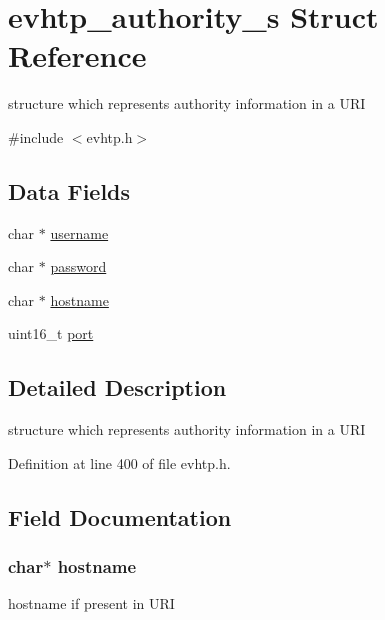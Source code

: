 \hypertarget{structevhtp__authority__s}{\section{evhtp\-\_\-authority\-\_\-s Struct Reference}
\label{structevhtp__authority__s}
}


structure which represents authority information in a U\-R\-I  




{\ttfamily \#include $<$evhtp.\-h$>$}

\subsection*{Data Fields}
\begin{DoxyCompactItemize}
\item 
char $\ast$ \hyperlink{structevhtp__authority__s_a9b20c006bd90a09e1465fb668700e81d}{username}
\item 
char $\ast$ \hyperlink{structevhtp__authority__s_a59460a3ff2c12443d1022e5cc0fba85c}{password}
\item 
char $\ast$ \hyperlink{structevhtp__authority__s_af203df082d5c6dcaa0c88b07cf86466d}{hostname}
\item 
uint16\-\_\-t \hyperlink{structevhtp__authority__s_a8e0798404bf2cf5dabb84c5ba9a4f236}{port}
\end{DoxyCompactItemize}


\subsection{Detailed Description}
structure which represents authority information in a U\-R\-I 

Definition at line 400 of file evhtp.\-h.



\subsection{Field Documentation}
\hypertarget{structevhtp__authority__s_af203df082d5c6dcaa0c88b07cf86466d}{
\subsubsection[{hostname}]{\setlength{\rightskip}{0pt plus 5cm}char$\ast$ hostname}}\label{structevhtp__authority__s_af203df082d5c6dcaa0c88b07cf86466d}
hostname if present in U\-R\-I 

